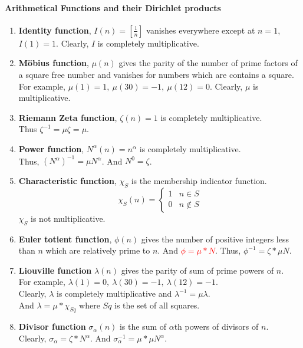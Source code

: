 \paragraph{Arithmetical Functions and their Dirichlet products}
\begin{enumerate}
	\item \textbf{Identity function}, $I(n) = \left[\frac{1}{n}\right]$ vanishes everywhere except at $n = 1$, $I(1) = 1$.
	Clearly, $I$ is completely multiplicative.
	\item \textbf{M\"obius function}, $\mu(n)$ gives the parity of the number of prime factors of a square free number and vanishes for numbers which are contains a square.\\
	For example, $\mu(1) = 1,\ \mu(30) = -1,\ \mu(12) = 0$.
	Clearly, $\mu$ is multiplicative.
\item \textbf{Riemann Zeta function}, $\zeta(n) = 1$ is completely multiplicative.\\
	Thus $\zeta^{-1} = \mu \zeta = \mu$.
	\item \textbf{Power function}, $N^\alpha(n) = n^\alpha$ is completely multiplicative.\\
	Thus, $(N^\alpha)^{-1} = \mu N^\alpha$. And $N^0 = \zeta$.
	\item \textbf{Characteristic function}, $\chi_S$ is the membership indicator function.
	$$\chi_S(n) = \begin{cases} 1 & n \in S \\ 0 & n \notin S \end{cases}$$
	$\chi_S$ is not multiplicative.
	\item \textbf{Euler totient function}, $\phi(n)$ gives the number of positive integers less than $n$ which are relatively prime to $n$. And \textcolor{red}{$\phi = \mu \ast N$}. Thus, $\phi^{-1} = \zeta \ast \mu N$.
	\item \textbf{Liouville function} $\lambda(n)$ gives the parity of sum of prime powers of $n$.\\
	For example, $\lambda(1) = 0,\ \lambda(30)=-1,\ \lambda(12)=-1$.\\
	Clearly, $\lambda$ is completely multiplicative and $\lambda^{-1} = \mu \lambda$.\\
	And $\lambda = \mu \ast \chi_{Sq}$ where $Sq$ is the set of all squares.
	\item \textbf{Divisor function} $\sigma_\alpha(n)$ is the sum of $\alpha$th powers of divisors of $n$.\\ Clearly, $\sigma_\alpha = \zeta \ast N^\alpha$. And $\sigma_\alpha^{-1} = \mu \ast \mu N^\alpha$.

\end{enumerate}
